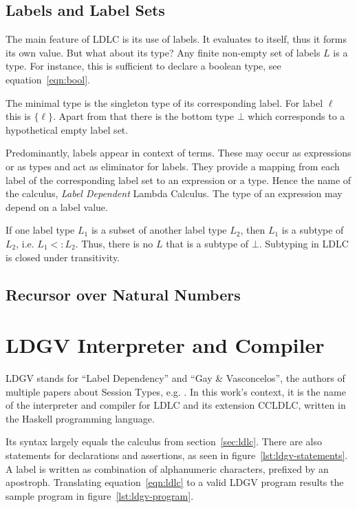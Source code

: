 \subsection{Labels and Label Sets}

The main feature of LDLC is its use of labels. It evaluates to itself, thus it forms its own value. But what about its type? Any finite non-empty set of labels $L$ is a type. For instance, this is sufficient to declare a boolean type, see equation~\ref{eqn:bool}.

The minimal type is the singleton type of its corresponding label. For label $\ell$ this is $\{\ell\}$. Apart from that there is the bottom type $\bot$ which corresponds to a hypothetical empty label set.

Predominantly, labels appear in context of \case terms. These may occur as expressions or as types and act as eliminator for labels. They provide a mapping from each label of the corresponding label set to an expression or a type. Hence the name of the calculus, \emph{Label Dependent} Lambda Calculus. The type of an expression may depend on a label value.

If one label type $L_1$ is a subset of another label type $L_2$, then $L_1$ is a subtype of $L_2$, i.e. $L_1 <: L_2$. Thus, there is no $L$ that is a subtype of $\bot$. Subtyping in LDLC is closed under transitivity.

\subsection{Recursor over Natural Numbers}


\section{LDGV Interpreter and Compiler}

LDGV stands for ``Label Dependency'' and ``Gay \& Vasconcelos'', the authors of multiple papers about Session Types, e.g. \cite{gayvasconcelos2010}. In this work's context, it is the name of the interpreter and compiler for LDLC and its extension CCLDLC, written in the Haskell programming language.

Its syntax largely equals the calculus from section~\ref{sec:ldlc}. There are also statements for declarations and assertions, as seen in figure~\ref{lst:ldgv-statements}.
A label is written as combination of alphanumeric characters, prefixed by an apostroph. Translating equation~\ref{eqn:ldlc} to a valid LDGV program results the sample program in figure~\ref{lst:ldgv-program}.

